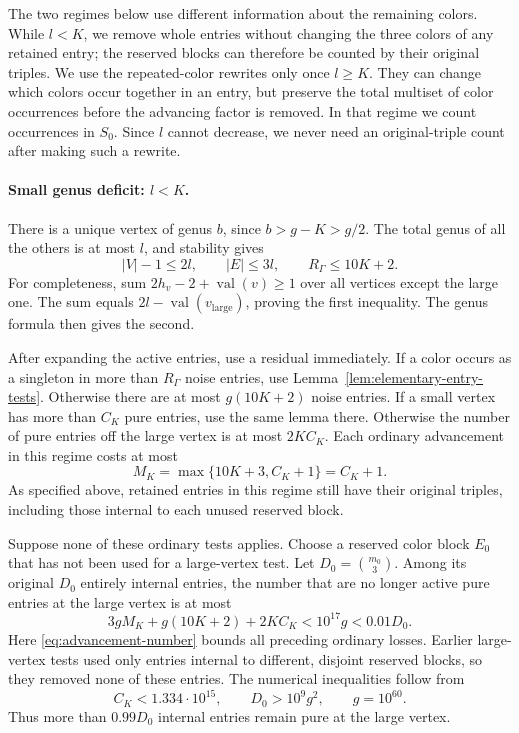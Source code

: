 The two regimes below use different information about the remaining
colors.  While \(l<K\), we remove whole entries without changing the
three colors of any retained entry; the reserved blocks can therefore
be counted by their original triples.  We use the repeated-color
rewrites only once \(l\ge K\).  They can change which colors occur
together in an entry, but preserve the total multiset of color
occurrences before the advancing factor is removed.  In that regime
we count occurrences in \(S_0\).  Since \(l\) cannot decrease, we never
need an original-triple count after making such a rewrite.

\paragraph{Small genus deficit: \(l<K\).}
There is a unique vertex of genus \(b\), since \(b>g-K>g/2\).
The total genus of all the others is at most \(l\), and stability gives
\begin{equation}
\label{eq:small-graph-size}
 |V|-1\le2l,\qquad |E|\le3l,\qquad R_\Gamma\le10K+2.
\end{equation}
For completeness, sum \(2h_v-2+\operatorname{val}(v)\ge1\) over all
vertices except the large one.  The sum equals
\(2l-\operatorname{val}(v_{\mathrm{large}})\), proving the first
inequality.  The genus formula then gives the second.

After expanding the active entries, use a residual immediately.
If a color occurs as a singleton in more than \(R_\Gamma\) noise entries,
use Lemma~\ref{lem:elementary-entry-tests}.  Otherwise there are at most
\(g(10K+2)\) noise entries.  If a small vertex has more than \(C_K\)
pure entries, use the same lemma there.  Otherwise the number of pure
entries off the large vertex is at most \(2K C_K\).
Each ordinary advancement in this regime costs at most
\[
 M_K=\max\{10K+3,C_K+1\}=C_K+1.
\]
As specified above, retained entries in this regime still have their
original triples, including those internal to each unused reserved
block.

Suppose none of these ordinary tests applies.  Choose a reserved color
block \(E_0\) that has not been used for a large-vertex test.  Let
\(D_0=\binom{m_0}{3}\).  Among its original \(D_0\) entirely internal
entries, the number that are no longer active pure entries at the large
vertex is at most
\begin{equation}
\label{eq:small-loss}
 3gM_K+g(10K+2)+2K C_K
 <10^{17}g<0.01D_0.
\end{equation}
Here \eqref{eq:advancement-number} bounds all preceding ordinary losses.
Earlier large-vertex tests used only entries internal to different,
disjoint reserved blocks, so they removed none of these entries.
The numerical inequalities follow from
\[
 C_K<1.334\cdot10^{15},
 \qquad D_0>10^9g^2,
 \qquad g=10^{60}.
\]
Thus more than \(0.99D_0\) internal entries remain pure at the large
vertex.

